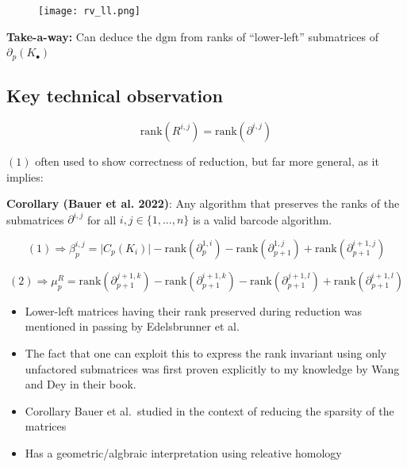 \documentclass[
  letterpaper,
  DIV=11,
  numbers=noendperiod,
  oneside]{scrartcl}
\providecommand{\tightlist}{%
  \setlength{\itemsep}{0pt}\setlength{\parskip}{0pt}}\usepackage{longtable,booktabs,array}
\begin{document}
\begin{figure}

{\centering \texttt{[image: rv\_ll.png]}

}

\end{figure}

\textbf{Take-a-way:} Can deduce the \(\mathrm{dgm}\) from ranks of
``lower-left'' submatrices of \(\partial_p(K_\bullet)\)

\hypertarget{key-technical-observation-2}{%
\subsection{Key technical
observation}\label{key-technical-observation-2}}

\[ 
\begin{equation}
\mathrm{rank}(R^{i,j}) = \mathrm{rank}(\partial^{i,j})  
\end{equation}
\]

\((1)\) often used to show correctness of reduction, but far more
general, as it implies:

\textbf{Corollary (Bauer et al. 2022)}: Any algorithm that preserves the
ranks of the submatrices \(\partial^{i,j}\) for all
\(i,j \in \{ 1, \dots, n \}\) is a valid barcode algorithm.

\[ 
\begin{equation}
(1) \Rightarrow \beta_p^{i,j} = \lvert C_p(K_i) \rvert - \mathrm{rank}(\partial_p^{1,i}) - \mathrm{rank}(\partial_{p+1 }^{1,j}) + \mathrm{rank}(\partial_{p+1}^{i + 1, j} ) 
\end{equation}
\]

\[ 
\begin{equation}
(2) \Rightarrow \mu_p^{R} = \mathrm{rank}(\partial_{p+1}^{j + 1, k})  - \mathrm{rank}(\partial_{p+1}^{i + 1, k})  - \mathrm{rank}(\partial_{p+1}^{j + 1, l}) + \mathrm{rank}(\partial_{p+1}^{i + 1, l})  
\end{equation}
\]


\begin{itemize}
\tightlist
\item
  Lower-left matrices having their rank preserved during reduction was
  mentioned in passing by Edelsbrunner et al.
\item
  The fact that one can exploit this to express the rank invariant using
  only unfactored submatrices was first proven explicitly to my
  knowledge by Wang and Dey in their book.
\item
  Corollary Bauer et al.~studied in the context of reducing the sparsity
  of the matrices
\item
  Has a geometric/algbraic interpretation using releative homology
\end{itemize}
\end{document}
